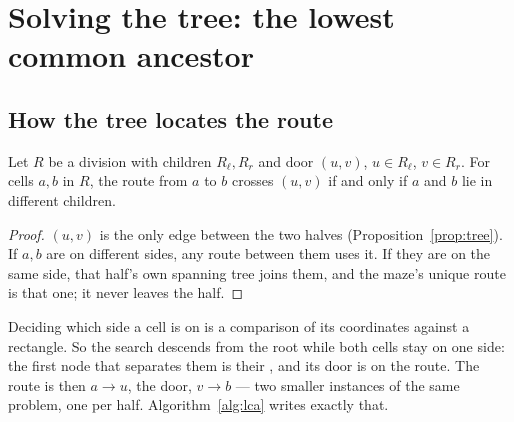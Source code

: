 \section{Solving the tree: the lowest common ancestor}
\label{sec:lca}

\subsection{How the tree locates the route}

\begin{proposition}[Separation]
\label{prop:separation}
Let $R$ be a division with children $R_\ell,R_r$ and door $(u,v)$, $u\in R_\ell$,
$v\in R_r$. For cells $a,b$ in $R$, the route from $a$ to $b$ crosses $(u,v)$
if and only if $a$ and $b$ lie in different children.
\end{proposition}

\begin{proof}
$(u,v)$ is the only edge between the two halves (Proposition~\ref{prop:tree}).
If $a,b$ are on different sides, any route between them uses it. If they are on
the same side, that half's own spanning tree joins them, and the maze's unique
route is that one; it never leaves the half.
\end{proof}



Deciding which side a cell is on is a comparison of its coordinates against a
rectangle. So the search descends from the root while both cells stay on one
side: the first node that separates them is their , and its door is on the route. The route is then $a\to u$, the door,
$v\to b$ --- two smaller instances of the same problem, one per half.
Algorithm~\ref{alg:lca} writes exactly that.

\begin{algorithm}[H]
\caption{The route from $a$ to $b$, both inside the tree node $R$.}
\label{alg:lca}
\BlankLine
{}
\BlankLine
{}
\end{algorithm}

